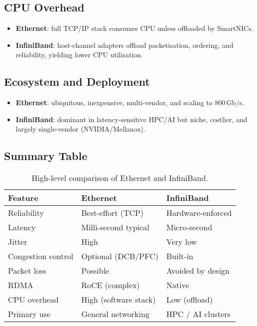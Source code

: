 \subsection{CPU Overhead}
\begin{itemize}
  \item \textbf{Ethernet}: full TCP/IP stack consumes CPU unless
        offloaded by SmartNICs.
  \item \textbf{InfiniBand}: host-channel adapters offload
        packetisation, ordering, and reliability, yielding lower CPU
        utilisation.
\end{itemize}

\subsection{Ecosystem and Deployment}
\begin{itemize}
  \item \textbf{Ethernet}: ubiquitous, inexpensive, multi-vendor, and
        scaling to 800\,Gb/s.
  \item \textbf{InfiniBand}: dominant in latency-sensitive HPC/AI
        but niche, costlier, and largely single-vendor (NVIDIA/Mellanox).
\end{itemize}

\subsection{Summary Table}
\begin{table}[h]
\centering
\small
\begin{tabular}{lll}
\toprule
\textbf{Feature} & \textbf{Ethernet} & \textbf{InfiniBand}\\
\midrule
Reliability        & Best-effort (TCP)         & Hardware-enforced\\
Latency            & Milli-second typical      & Micro-second\\
Jitter             & High                     & Very low\\
Congestion control & Optional (DCB/PFC)       & Built-in\\
Packet loss        & Possible                 & Avoided by design\\
RDMA               & RoCE (complex)           & Native\\
CPU overhead       & High (software stack)    & Low (offload)\\
Primary use        & General networking       & HPC / AI clusters\\
\bottomrule
\end{tabular}
\caption{High-level comparison of Ethernet and InfiniBand.}
\end{table}

